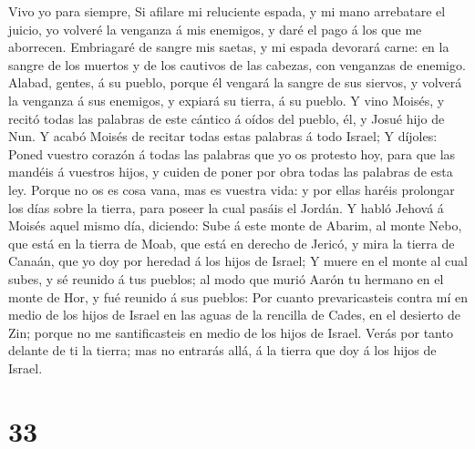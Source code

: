 Vivo yo para siempre,  Si afilare mi reluciente espada, y
mi mano arrebatare el juicio, yo volveré la venganza á mis enemigos, y
daré el pago á los que me aborrecen.  Embriagaré de sangre
mis saetas, y mi espada devorará carne: en la sangre de los muertos y de
los cautivos de las cabezas, con venganzas de enemigo. 
Alabad, gentes, á su pueblo, porque él vengará la sangre de sus siervos,
y volverá la venganza á sus enemigos, y expiará su tierra, á su pueblo.
 Y vino Moisés, y recitó todas las palabras de este cántico
á oídos del pueblo, él, y Josué hijo de Nun.  Y acabó
Moisés de recitar todas estas palabras á todo Israel;  Y
díjoles: Poned vuestro corazón á todas las palabras que yo os protesto
hoy, para que las mandéis á vuestros hijos, y cuiden de poner por obra
todas las palabras de esta ley.  Porque no os es cosa vana,
mas es vuestra vida: y por ellas haréis prolongar los días sobre la
tierra, para poseer la cual pasáis el Jordán.  Y habló
Jehová á Moisés aquel mismo día, diciendo:  Sube á este
monte de Abarim, al monte Nebo, que está en la tierra de Moab, que está
en derecho de Jericó, y mira la tierra de Canaán, que yo doy por heredad
á los hijos de Israel;  Y muere en el monte al cual subes,
y sé reunido á tus pueblos; al modo que murió Aarón tu hermano en el
monte de Hor, y fué reunido á sus pueblos:  Por cuanto
prevaricasteis contra mí en medio de los hijos de Israel en las aguas de
la rencilla de Cades, en el desierto de Zin; porque no me santificasteis
en medio de los hijos de Israel.  Verás por tanto delante
de ti la tierra; mas no entrarás allá, á la tierra que doy á los hijos
de Israel.

\hypertarget{section-32}{%
\section{33}\label{section-32}}

